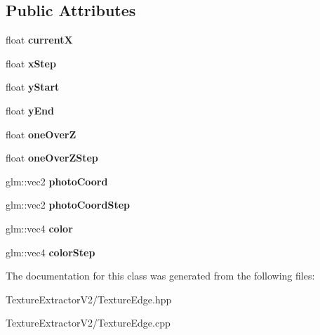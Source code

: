 \subsection*{Public Attributes}
\begin{DoxyCompactItemize}
\item 
\hypertarget{class_texture_edge_a7c3b80e498b2695a022e27c9585ce179}{}float {\bfseries current\+X}\label{class_texture_edge_a7c3b80e498b2695a022e27c9585ce179}

\item 
\hypertarget{class_texture_edge_a25cef82338114b36eb787cf7388f51c2}{}float {\bfseries x\+Step}\label{class_texture_edge_a25cef82338114b36eb787cf7388f51c2}

\item 
\hypertarget{class_texture_edge_aedbd23f82d3d7bcefa909a817ecd1352}{}float {\bfseries y\+Start}\label{class_texture_edge_aedbd23f82d3d7bcefa909a817ecd1352}

\item 
\hypertarget{class_texture_edge_a2974871a249726ee903849f14ded2bf5}{}float {\bfseries y\+End}\label{class_texture_edge_a2974871a249726ee903849f14ded2bf5}

\item 
\hypertarget{class_texture_edge_a6dd2c8650dd32b7150b3f6b62b338360}{}float {\bfseries one\+Over\+Z}\label{class_texture_edge_a6dd2c8650dd32b7150b3f6b62b338360}

\item 
\hypertarget{class_texture_edge_a074ed9078d97be9319aa786ffdcf5a2e}{}float {\bfseries one\+Over\+Z\+Step}\label{class_texture_edge_a074ed9078d97be9319aa786ffdcf5a2e}

\item 
\hypertarget{class_texture_edge_abb286c00988b8204557806352f3a08fb}{}glm\+::vec2 {\bfseries photo\+Coord}\label{class_texture_edge_abb286c00988b8204557806352f3a08fb}

\item 
\hypertarget{class_texture_edge_abe3b2ba9ef56a213949cfd899b0bcd86}{}glm\+::vec2 {\bfseries photo\+Coord\+Step}\label{class_texture_edge_abe3b2ba9ef56a213949cfd899b0bcd86}

\item 
\hypertarget{class_texture_edge_ab0f8a2b476e5a4bc28f7d95b0753ac69}{}glm\+::vec4 {\bfseries color}\label{class_texture_edge_ab0f8a2b476e5a4bc28f7d95b0753ac69}

\item 
\hypertarget{class_texture_edge_a978d737a720ca72aac38a02e6d190c05}{}glm\+::vec4 {\bfseries color\+Step}\label{class_texture_edge_a978d737a720ca72aac38a02e6d190c05}

\end{DoxyCompactItemize}


The documentation for this class was generated from the following files\+:\begin{DoxyCompactItemize}
\item 
Texture\+Extractor\+V2/Texture\+Edge.\+hpp\item 
Texture\+Extractor\+V2/Texture\+Edge.\+cpp\end{DoxyCompactItemize}
